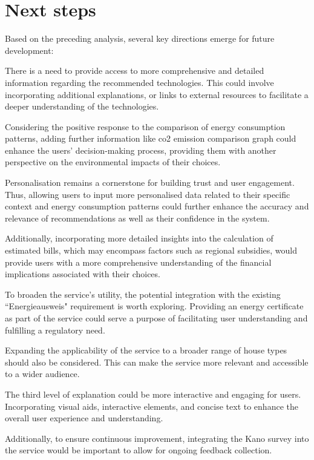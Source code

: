 \section{Next steps}

Based on the preceding analysis, several key directions emerge for future development:

There is a need to provide access to more comprehensive and detailed information regarding the recommended technologies. 
This could involve incorporating additional explanations, or links to external resources to facilitate a deeper understanding of the technologies.

Considering the positive response to the comparison of energy consumption patterns, adding further information like \gls{co2} emission comparison graph could enhance the users' decision-making process, providing them with another perspective on the environmental impacts of their choices.

Personalisation remains a cornerstone for building trust and user engagement. 
Thus, allowing users to input more personalised data related to their specific context and energy consumption patterns could further enhance the accuracy and relevance of recommendations as well as their confidence in the system.

Additionally, incorporating more detailed insights into the calculation of estimated bills, which may encompass factors such as regional subsidies, would provide users with a more comprehensive understanding of the financial implications associated with their choices.

To broaden the service's utility, the potential integration with the existing ``Energieausweis" requirement is worth exploring. 
Providing an energy certificate as part of the service could serve a purpose of facilitating user understanding and fulfilling a regulatory need.

Expanding the applicability of the service to a broader range of house types should also be considered. 
This can make the service more relevant and accessible to a wider audience. 

The third level of explanation could be more interactive and engaging for users. 
Incorporating visual aids, interactive elements, and concise text to enhance the overall user experience and understanding.

Additionally, to ensure continuous improvement, integrating the Kano survey into the service would be important to allow for ongoing feedback collection. 

